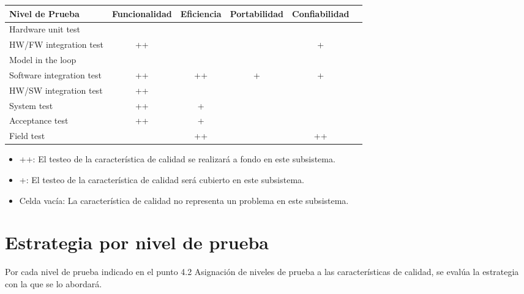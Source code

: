 \documentclass[
11pt, %
]{charter}
\begin{document}
\begin{table}[h!]
\begin{center}
\begin{tabular}{| l | c | c | c | c | c |}
\hline
\rowcolor[HTML]{C0C0C0}
Nivel de Prueba 			&Funcionalidad 	& Eficiencia 	& Portabilidad 	& Confiabilidad \\ \hline
Hardware unit test          &      			&     			& 				&   			\\ \hline
HW/FW integration test      &     ++  		&     			& 				&   	+		\\ \hline
Model in the loop            &      			&     			& 				&   			\\ \hline
Software integration test   &     ++		&     	++		& 		+		&   	+		\\ \hline
HW/SW integration test      &     ++		&     			& 				&   			\\ \hline
System test 				&     ++			&     	+		& 				&   			\\ \hline
Acceptance test 			&     ++		&     	+		& 				&   			\\ \hline
Field test 					&       		&     	++		& 				&   	++		\\ \hline
\end{tabular}
\end{center}
\end{table}
 
\begin{itemize}
\item[]++: El testeo de la característica de calidad se realizará a fondo en este subsistema.
\item[]+: El testeo de la característica de calidad será cubierto en este subsistema.
\item[]Celda vacía: La característica de calidad no representa un problema en este subsistema.
\end{itemize}


\section{Estrategia por nivel de prueba}
\label{sec:org49fe900}

Por cada nivel de prueba indicado en el punto 4.2 Asignación de niveles de prueba a
las características de calidad, se evalúa la estrategia con la que se lo abordará.

\end{document}
